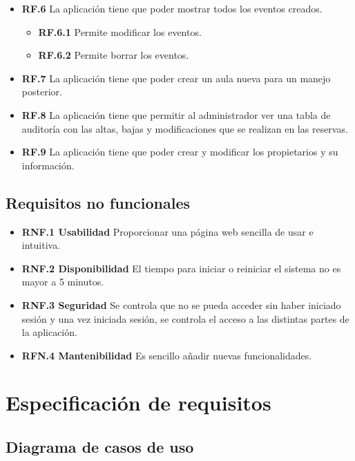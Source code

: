 \begin{itemize}
\begin{itemize}
    \end{itemize}
    \item \textbf{RF.6} La aplicación tiene que poder mostrar todos los eventos creados.
    \begin{itemize}
        \item \textbf{RF.6.1} Permite modificar los eventos.
        \item \textbf{RF.6.2} Permite borrar los eventos.
    \end{itemize}
    \item \textbf{RF.7} La aplicación tiene que poder crear un aula nueva para un manejo posterior.
    \item \textbf{RF.8} La aplicación tiene que permitir al administrador ver  una tabla de auditoría con las altas, bajas y modificaciones que se realizan en las reservas.
    \item \textbf{RF.9} La aplicación tiene que poder crear y modificar los propietarios y su información.
    
\end{itemize}

\subsection{Requisitos no funcionales}
\begin{itemize}
	\item \textbf{RNF.1 Usabilidad} Proporcionar una página web sencilla de usar e intuitiva.
	\item \textbf{RNF.2 Disponibilidad} El tiempo para iniciar o reiniciar el sistema no es mayor a 5 minutos.
	\item \textbf{RNF.3 Seguridad} Se controla que no se pueda acceder sin haber iniciado sesión y una vez iniciada sesión, se controla el acceso a las distintas partes de la aplicación.
	\item \textbf{RFN.4 Mantenibilidad} Es sencillo añadir nuevas funcionalidades.
\end{itemize}
\newpage
\section{Especificación de requisitos}
\subsection{Diagrama de casos de uso}


